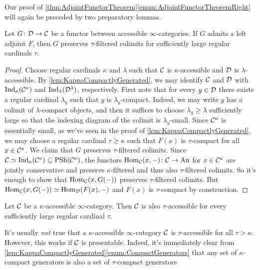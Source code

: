 Our proof of \cref{thm:AdjointFunctorTheorem}\cref{enum:AdjointFunctorTheoremRight} will again be preceded by two preparatory lemmas.
\begin{lem}\label{lem:RightAdjointsAccessible}
	Let $G\colon \mathcal{D}\rightarrow\mathcal{C}$ be a functor between accessible $\infty$-categories. If $G$ admits a left adjoint $F$, then $G$ preserves $\tau$-filtered colimits for sufficiently large regular cardinals $\tau$.
\end{lem}
\begin{proof}
	Choose regular cardinals $\kappa$ and $\lambda$ such that $\mathcal{C}$ is $\kappa$-accessible and $\mathcal{D}$ is $\lambda$-accessible. By \cref{lem:KappaCompactlyGenerated}, we may identify $\mathcal{C}$ and $\mathcal{D}$ with $\mathrm{Ind}_\kappa(\mathcal{C}^\kappa)$ and $\mathrm{Ind}_\lambda(\mathcal{D}^\lambda)$, respectively. First note that for every $y\in\mathcal{D}$ there exists a regular cardinal $\lambda_y$ such that $y$ is $\lambda_y$-compact. Indeed, we may write $y$ has a colimit of $\lambda$-compact objects, and then it suffices to choose $\lambda_y\geqslant \lambda$ sufficiently large so that the indexing diagram of the colimit is $\lambda_y$-small. Since $\mathcal{C}^\kappa$ is essentially small, as we've seen in the proof of \cref{lem:KappaCompactlyGenerated}, we may choose a regular cardinal $\tau\geqslant \kappa$ such that $F(x)$ is $\tau$-compact for all $x\in\mathcal{C}^\kappa$. We claim that $G$ preserves $\tau$-filtered colimits. Since $\mathcal{C}\simeq\mathrm{Ind}_\kappa(\mathcal{C}^\kappa)\subseteq \operatorname{PSh}(\mathcal{C}^\kappa)$, the functors $\operatorname{Hom}_{\mathcal{C}}(x,-)\colon \mathcal{C}\rightarrow \mathrm{An}$ for $x\in\mathcal{C}^\kappa$ are jointly conservative and preserve $\kappa$-filtered and thus also $\tau$-filtered colimits. So it's enough to show that $\operatorname{Hom}_{\mathcal{C}}(x,G(-))$ preserves $\tau$-filtered colimits. But $\operatorname{Hom}_{\mathcal{C}}(x,G(-))\simeq \operatorname{Hom}_{\mathcal{D}}(F(x),-)$ and $F(x)$ is $\tau$-compact by construction.
\end{proof}
\begin{lem}\label{lem:Accessible}
	Let $\mathcal{C}$ be a $\kappa$-accessible $\infty$-category. Then $\mathcal{C}$ is also $\tau$-accessible for every sufficiently large regular cardinal $\tau$.
\end{lem}
\begin{rem}\label{rem:Accessible}
	It's usually \emph{not} true that a $\kappa$-accessible $\infty$-category $\mathcal{C}$ is $\tau$-accessible for all $\tau >\kappa$. However, this works if $\mathcal{C}$ is presentable. Indeed, it's immediately clear from \cref{lem:KappaCompactlyGenerated}\cref{enum:CompactGenerators} that any set of $\kappa$-compact generators is also a set of $\tau$-compact generators 
\end{rem}
